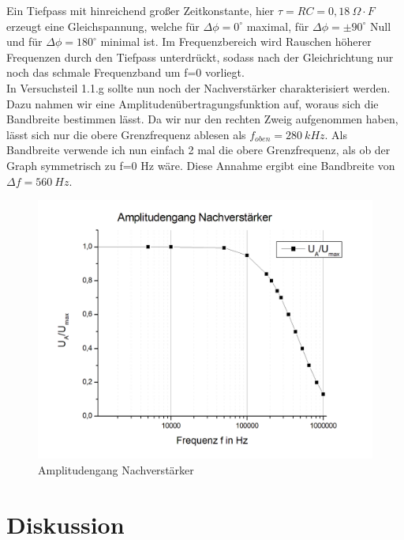 \documentclass{scrartcl}						%
\begin{document}
			 \newline
			 Ein Tiefpass mit hinreichend großer Zeitkonstante, hier $ \tau =RC=0,18 \ \Omega \cdot F $ erzeugt eine Gleichspannung, welche für $ \Delta \phi =0^\circ $ maximal, für $ \Delta \phi = \pm 90^\circ $ Null und für $ \Delta \phi =180^\circ $ minimal ist. Im Frequenzbereich wird Rauschen höherer Frequenzen durch den Tiefpass unterdrückt, sodass nach der Gleichrichtung nur noch das schmale Frequenzband um f=0 vorliegt.
			 \newline \\
			 In Versuchsteil 1.1.g sollte nun noch der Nachverstärker charakterisiert werden. Dazu nahmen wir eine Amplitudenübertragungsfunktion auf, woraus sich die Bandbreite bestimmen lässt. Da wir nur den rechten Zweig aufgenommen haben, lässt sich nur die obere Grenzfrequenz ablesen als $ f_{oben}=280\ kHz $. Als Bandbreite verwende ich nun einfach 2 mal die obere Grenzfrequenz, als ob der Graph symmetrisch zu f=0 Hz wäre. Diese Annahme ergibt eine Bandbreite von $ \Delta f =560\ Hz $.
			 \begin{figure}[h!]
				 \centering
				 \includegraphics[scale=0.3]{A1g}
				 \caption{Amplitudengang Nachverstärker}
			 \end{figure}
			 
			 
	\clearpage

\section{Diskussion}
				
\end{document}
